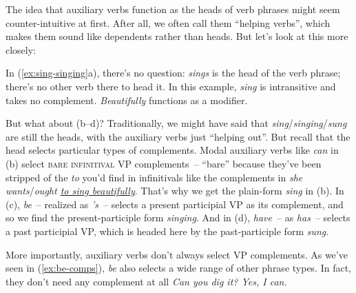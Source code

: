 The idea that auxiliary verbs function as the heads of verb phrases might seem counter-intuitive at first. After all, we often call them ``helping verbs'', which makes them sound like dependents rather than heads. But let's look at this more closely:


In (\ref{ex:sing-singing}a), there's no question: \textit{sings} is the head of the verb phrase; there's no other verb there to head it. In this example, \textit{sing} is intransitive and takes no complement. \textit{Beautifully} functions as a modifier.

But what about (b--d)? Traditionally, we might have said that \textit{sing}/\textit{singing}/\textit{sung} are still the heads, with the auxiliary verbs just ``helping out''. But recall that the head selects particular types of complements. Modal auxiliary verbs like \textit{can} in (b) select \textsc{bare infinitival} VP complements~-- ``bare'' because they've been stripped of the \textit{to} you'd find in infinitivals like the complements in \textit{she wants}/\textit{ought \uline{to sing beautifully}}. That's why we get the plain-form \textit{sing} in (b). In (c), \textit{be}~-- realized as \textit{'s}~-- selects a present participial VP as its complement, and so we find the present-participle form \textit{singing}. And in (d), \textit{have}~-- as \textit{has}~-- selects a past participial VP, which is headed here by the past-participle form \textit{sung}.

More importantly, auxiliary verbs don't always select VP complements. As we've seen in (\ref{ex:be-comps}), \textit{be} also selects a wide range of other phrase types. In fact, they don't need any complement at all \textit{Can you dig it? Yes, I can.}

